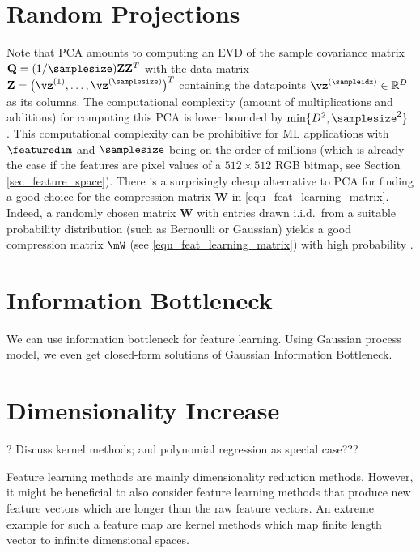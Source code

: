 \documentclass[12pt]{report}
\begin{document}
\section{Random Projections} 
Note that PCA amounts to computing an EVD of the sample covariance matrix 
$\mathbf{Q} = (1/\samplesize) \mathbf{Z} \mathbf{Z}^{T}$ with the data matrix 
$\mathbf{Z} = \big(\vz^{(1)},\ldots,\vz^{(\samplesize)}\big)^{T}$ containing the 
datapoints $\vz^{(\sampleidx)} \in \mathbb{R}^{D}$ as its columns. The computational 
complexity (amount of multiplications and additions) for computing this PCA is lower 
bounded by $\min\{ D^{2}, \samplesize^{2} \}$ \cite{Du08low-complexityprincipal,Sharma2007}. 
This computational complexity can be prohibitive for ML applications with $\featuredim$ 
and $\samplesize$ being on the order of millions (which is already the case if the features 
are pixel values of a $512 \times 512$ RGB bitmap, see Section \ref{sec_feature_space}). 
There is a surprisingly cheap alternative to PCA for finding a good choice for the 
compression matrix $\mathbf{W}$ in \eqref{equ_feat_learning_matrix}. Indeed, a randomly 
chosen matrix $\mathbf{W}$ with entries drawn i.i.d.\ from a suitable probability distribution 
(such as Bernoulli or Gaussian) yields a good compression matrix $\mW$ (see \eqref{equ_feat_learning_matrix}) 
with high probability \cite{Bingham01randomprojection,jung-specesttit}. 


\section{Information Bottleneck}
We can use information bottleneck for feature learning. Using Gaussian process model, we even 
get closed-form solutions of Gaussian Information Bottleneck. 


\section{Dimensionality Increase} 
\label{sec_dim_increas} 

? Discuss kernel methods; and polynomial regression as special case???

Feature learning methods are mainly dimensionality reduction methods.
However, it might be beneficial to also consider feature learning methods 
that produce new feature vectors which are longer than the raw feature 
vectors. An extreme example for such a feature map are kernel 
methods which map finite length vector to infinite dimensional spaces. 
\end{document}
